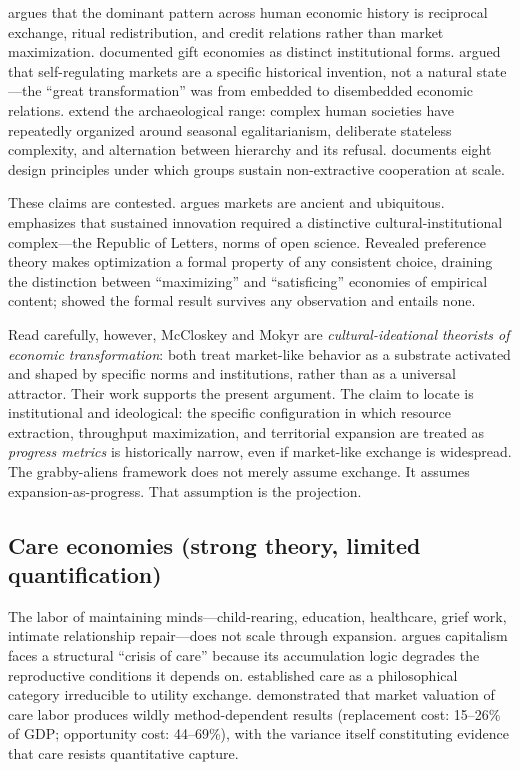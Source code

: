 \documentclass[11pt,a4paper,twocolumn]{article}
\begin{document}
\citet{graeber2011} argues that the dominant pattern across human
economic history is reciprocal exchange, ritual redistribution, and
credit relations rather than market maximization. \citet{mauss1925}
documented gift economies as distinct institutional forms.
\citet{polanyi1944} argued that self-regulating markets are a specific
historical invention, not a natural state---the ``great transformation''
was from embedded to disembedded economic relations.
\citet{graeberwengrow2021} extend the archaeological range: complex
human societies have repeatedly organized around seasonal egalitarianism,
deliberate stateless complexity, and alternation between hierarchy and
its refusal. \citet{ostrom1990} documents eight design principles under
which groups sustain non-extractive cooperation at scale.

These claims are contested. \citet{mccloskey2010,mccloskey2016} argues
markets are ancient and ubiquitous. \citet{mokyr2016} emphasizes that
sustained innovation required a distinctive cultural-institutional
complex---the Republic of Letters, norms of open science. Revealed
preference theory \citep{varian2005} makes optimization a formal property
of any consistent choice, draining the distinction between ``maximizing''
and ``satisficing'' economies of empirical content; \citet{sen1977}
showed the formal result survives any observation and entails none.

Read carefully, however, McCloskey and Mokyr are \emph{cultural-ideational
theorists of economic transformation}: both treat market-like behavior as
a substrate activated and shaped by specific norms and institutions,
rather than as a universal attractor. Their work supports the present
argument. The claim to locate is institutional and ideological: the
specific configuration in which resource extraction, throughput
maximization, and territorial expansion are treated as \emph{progress
metrics} is historically narrow, even if market-like exchange is
widespread. The grabby-aliens framework does not merely assume exchange.
It assumes expansion-as-progress. That assumption is the projection.

\subsection{Care economies (strong theory, limited quantification)}

The labor of maintaining minds---child-rearing, education, healthcare,
grief work, intimate relationship repair---does not scale through
expansion. \citet{fraser2016} argues capitalism faces a structural
``crisis of care'' because its accumulation logic degrades the
reproductive conditions it depends on. \citet{tronto1993} established
care as a philosophical category irreducible to utility exchange.
\citet{folbre2008} demonstrated that market valuation of care labor
produces wildly method-dependent results (replacement cost: 15--26\% of
GDP; opportunity cost: 44--69\%), with the variance itself constituting
evidence that care resists quantitative capture.
\end{document}
